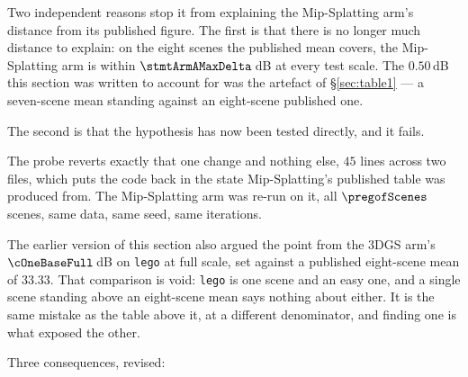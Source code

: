 Two independent reasons stop it from explaining the Mip-Splatting arm's distance
from its published figure. The first is that there is no longer much
distance to explain: on the eight scenes the published mean covers, the Mip-Splatting arm is
within $\stmtArmAMaxDelta$\,dB at every test scale. The $0.50$\,dB this section
was written to account for was the artefact of \S\ref{sec:table1} --- a
seven-scene mean standing against an eight-scene published one.

The second is that the hypothesis has now been tested directly, and it fails.



The probe reverts exactly that one change and nothing else, $45$ lines across
two files, which puts the code back in the state Mip-Splatting's published table
was produced from. The Mip-Splatting arm was re-run on it, all
$\pregofScenes$ scenes, same data, same
seed, same iterations.


The earlier version of this section also argued the point from the 3DGS arm's
$\cOneBaseFull$\,dB on \texttt{lego} at full scale, set against a published
eight-scene mean of $33.33$. That comparison is void: \texttt{lego} is one scene
and an easy one, and a single scene standing above an eight-scene mean says
nothing about either. It is the same mistake as the table above it, at a
different denominator, and finding one is what exposed the other.

Three consequences, revised:

